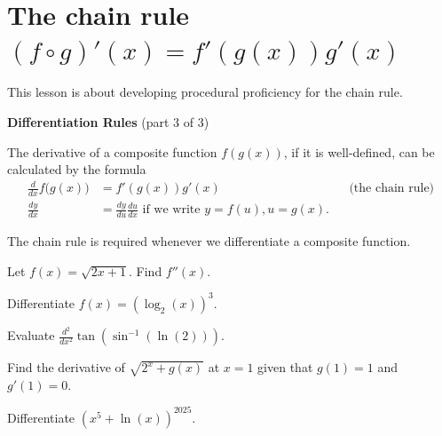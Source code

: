 \documentclass[../main.tex]{subfiles}
\begin{document}
 \section{The chain rule\texorpdfstring{ \((f \circ g)'(x) = f'(g(x))g'(x)\)}{}}

This lesson is about developing procedural proficiency for the chain rule.

\begin{mdframed}[style=simple-compact] \label{thm:diff-rules-3}
  \textbf{Differentiation Rules} \hfill {\footnotesize (part \(3\) of \(3\))}

  The derivative of a composite function \(f(g(x))\), if it is well-defined, can be calculated by the formula
  \begin{align*}
    \frac{d}{dx} f\big( g(x) \big)
    &= f'(g(x)) g'(x)
    &&\text{(the chain rule)}\\[1em]
    \frac{dy}{dx} &= \frac{dy}{du} \frac{du}{dx} \text{ if we write } y = f(u), u = g(x).
  \end{align*}
\end{mdframed}

\faStar{} The chain rule is required whenever we differentiate a composite function.

\begin{example}
  Let \(f(x) = \sqrt{2x + 1}\). Find \(f''(x)\).

  \blanks*
\end{example}

\begin{exercise}
  Differentiate \(f(x) = \left(\log_{2}(x)\right)^{3}\).

  \blanks*
\end{exercise}
\clearpage

\begin{example} \label{eg:chain-rule-constant}
  Evaluate \(\frac{d^{2}}{dx^{2}} \tan\left( \sin^{-1}(\ln(2))\right)\).

\end{example}

\begin{exercise}
  Find the derivative of \(\sqrt{2^{x} + g(x)}\) at \(x = 1\) given that \(g(1) = 1\) and \(g'(1) = 0\).

  \blanks*
\end{exercise}

\begin{exercise}
  Differentiate \(\left( x^{5} + \ln(x) \right)^{2025}\).

  \blanks*
\end{exercise}
\clearpage
\end{document}
